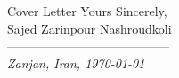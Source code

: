 \documentclass{resume} %
\begin{document}
\begin{cSection}{Cover Letter}
	\vspace*{1em}
	Yours Sincerely,\\
	\vspace*{0.5em}
	Sajed Zarinpour Nashroudkoli\\
	\normalsize
	---------------------------------------\\
	\tiny\textit{\scriptsize Zanjan, Iran, \today}
	\normalsize
\end{cSection}
\clearpage 
\newpage
\end{document}
